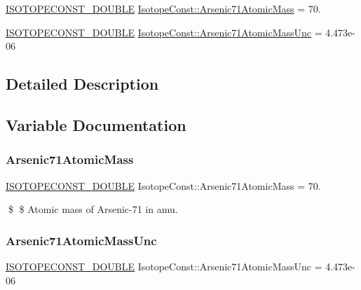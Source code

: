 \begin{DoxyCompactItemize}
\item 
\mbox{\hyperlink{group___isotope_const-_macros_ga8f45a7272ce02c0b4c65c44636ed719a}{I\+S\+O\+T\+O\+P\+E\+C\+O\+N\+S\+T\+\_\+\+D\+O\+U\+B\+LE}} \mbox{\hyperlink{group___isotope_const-_arsenic-_as71_gac6ce4d7a135a53fffc032633753fc43a}{Isotope\+Const\+::\+Arsenic71\+Atomic\+Mass}} = 70.
\item 
\mbox{\hyperlink{group___isotope_const-_macros_ga8f45a7272ce02c0b4c65c44636ed719a}{I\+S\+O\+T\+O\+P\+E\+C\+O\+N\+S\+T\+\_\+\+D\+O\+U\+B\+LE}} \mbox{\hyperlink{group___isotope_const-_arsenic-_as71_ga7af985182510de766622b819591bffc6}{Isotope\+Const\+::\+Arsenic71\+Atomic\+Mass\+Unc}} = 4.\+473e-\/06
\end{DoxyCompactItemize}


\subsection{Detailed Description}


\subsection{Variable Documentation}
\mbox{\label{group___isotope_const-_arsenic-_as71_gac6ce4d7a135a53fffc032633753fc43a}} 
\subsubsection{\texorpdfstring{Arsenic71\+Atomic\+Mass}{Arsenic71AtomicMass}}
{\footnotesize\ttfamily \mbox{\hyperlink{group___isotope_const-_macros_ga8f45a7272ce02c0b4c65c44636ed719a}{I\+S\+O\+T\+O\+P\+E\+C\+O\+N\+S\+T\+\_\+\+D\+O\+U\+B\+LE}} Isotope\+Const\+::\+Arsenic71\+Atomic\+Mass = 70.}

\$ \$ Atomic mass of Arsenic-\/71 in amu. \mbox{\label{group___isotope_const-_arsenic-_as71_ga7af985182510de766622b819591bffc6}} 
\subsubsection{\texorpdfstring{Arsenic71\+Atomic\+Mass\+Unc}{Arsenic71AtomicMassUnc}}
{\footnotesize\ttfamily \mbox{\hyperlink{group___isotope_const-_macros_ga8f45a7272ce02c0b4c65c44636ed719a}{I\+S\+O\+T\+O\+P\+E\+C\+O\+N\+S\+T\+\_\+\+D\+O\+U\+B\+LE}} Isotope\+Const\+::\+Arsenic71\+Atomic\+Mass\+Unc = 4.\+473e-\/06}

